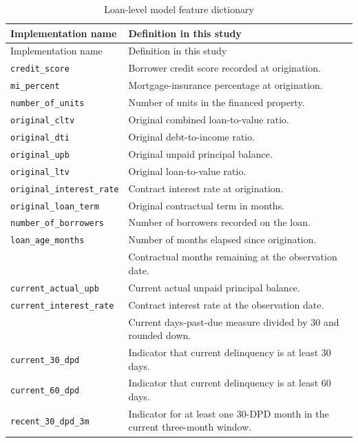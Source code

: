 \begin{longtable}{L{0.31\textwidth}L{0.60\textwidth}}
\caption{Loan-level model feature dictionary}\label{tab:loan-data-dictionary}\\
\toprule
Implementation name & Definition in this study \\
\midrule
\endfirsthead
\toprule
Implementation name & Definition in this study \\
\midrule
\endhead
\bottomrule
\endfoot
\texttt{credit\_score} & Borrower credit score recorded at origination. \\
\texttt{mi\_percent} & Mortgage-insurance percentage at origination. \\
\texttt{number\_of\_units} & Number of units in the financed property. \\
\texttt{original\_cltv} & Original combined loan-to-value ratio. \\
\texttt{original\_dti} & Original debt-to-income ratio. \\
\texttt{original\_upb} & Original unpaid principal balance. \\
\texttt{original\_ltv} & Original loan-to-value ratio. \\
\texttt{original\_interest\_rate} & Contract interest rate at origination. \\
\texttt{original\_loan\_term} & Original contractual term in months. \\
\texttt{number\_of\_borrowers} & Number of borrowers recorded on the loan. \\
\texttt{loan\_age\_months} & Number of months elapsed since origination. \\
 & Contractual months remaining at the observation date. \\
\texttt{current\_actual\_upb} & Current actual unpaid principal balance. \\
\texttt{current\_interest\_rate} & Contract interest rate at the observation date. \\
 & Current days-past-due measure divided by 30 and rounded down. \\
\texttt{current\_30\_dpd} & Indicator that current delinquency is at least 30 days. \\
\texttt{current\_60\_dpd} & Indicator that current delinquency is at least 60 days. \\
\texttt{recent\_30\_dpd\_3m} & Indicator for at least one 30-DPD month in the current three-month window. \\

\end{longtable}
